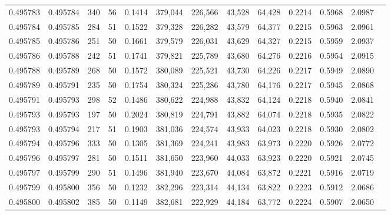 \begin{tabular}{rrrrrrrrrrrrr}
0.495783 & 0.495784 &   340 &  56 &                                     0.1414 & 379,044 & 226,566 &  43,528 &  64,428 & 0.2214 & 0.5968 & 2.0987 \\
0.495784 & 0.495785 &   284 &  51 &                                     0.1522 & 379,328 & 226,282 &  43,579 &  64,377 & 0.2215 & 0.5963 & 2.0961 \\
0.495785 & 0.495786 &   251 &  50 &                                     0.1661 & 379,579 & 226,031 &  43,629 &  64,327 & 0.2215 & 0.5959 & 2.0937 \\
0.495786 & 0.495788 &   242 &  51 &                                     0.1741 & 379,821 & 225,789 &  43,680 &  64,276 & 0.2216 & 0.5954 & 2.0915 \\
0.495788 & 0.495789 &   268 &  50 &                                     0.1572 & 380,089 & 225,521 &  43,730 &  64,226 & 0.2217 & 0.5949 & 2.0890 \\
0.495789 & 0.495791 &   235 &  50 &                                     0.1754 & 380,324 & 225,286 &  43,780 &  64,176 & 0.2217 & 0.5945 & 2.0868 \\
0.495791 & 0.495793 &   298 &  52 &                                     0.1486 & 380,622 & 224,988 &  43,832 &  64,124 & 0.2218 & 0.5940 & 2.0841 \\
0.495793 & 0.495793 &   197 &  50 &                                     0.2024 & 380,819 & 224,791 &  43,882 &  64,074 & 0.2218 & 0.5935 & 2.0822 \\
0.495793 & 0.495794 &   217 &  51 &                                     0.1903 & 381,036 & 224,574 &  43,933 &  64,023 & 0.2218 & 0.5930 & 2.0802 \\
0.495794 & 0.495796 &   333 &  50 &                                     0.1305 & 381,369 & 224,241 &  43,983 &  63,973 & 0.2220 & 0.5926 & 2.0772 \\
0.495796 & 0.495797 &   281 &  50 &                                     0.1511 & 381,650 & 223,960 &  44,033 &  63,923 & 0.2220 & 0.5921 & 2.0745 \\
0.495797 & 0.495799 &   290 &  51 &                                     0.1496 & 381,940 & 223,670 &  44,084 &  63,872 & 0.2221 & 0.5916 & 2.0719 \\
0.495799 & 0.495800 &   356 &  50 &                                     0.1232 & 382,296 & 223,314 &  44,134 &  63,822 & 0.2223 & 0.5912 & 2.0686 \\
0.495800 & 0.495802 &   385 &  50 &                                     0.1149 & 382,681 & 222,929 &  44,184 &  63,772 & 0.2224 & 0.5907 & 2.0650 \\

\end{tabular}
